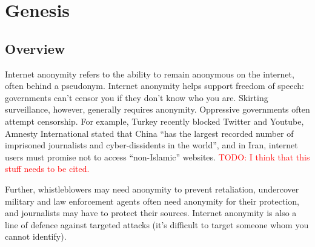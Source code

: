 \documentclass[12pt,a4paper]{article}
\begin{document}
\setcounter{tocdepth}{2}
\tableofcontents
\clearpage

\pagestyle{fancy}
\fancyhf{} %
\renewcommand{\headrulewidth}{0pt} %

\section{Genesis}
\subsection{Overview}
Internet anonymity refers to the ability to remain anonymous on the internet, often behind a pseudonym. Internet anonymity helps support freedom of speech: governments can't censor you if they don't know who you are. Skirting surveillance, however, generally requires anonymity. Oppressive governments often attempt censorship. For example, Turkey recently blocked Twitter and Youtube, Amnesty International stated that China ``has the largest recorded number of imprisoned journalists and cyber-dissidents in the world'', and in Iran, internet users must promise not to access ``non-Islamic'' websites.
\textcolor{red}{TODO: I think that this stuff needs to be cited.}

Further, whistleblowers may need anonymity to prevent retaliation, undercover military and law enforcement agents often need anonymity for their protection, and journalists may have to protect their sources. Internet anonymity is also a line of defence against targeted attacks (it's difficult to target someone whom you cannot identify).
\end{document}
